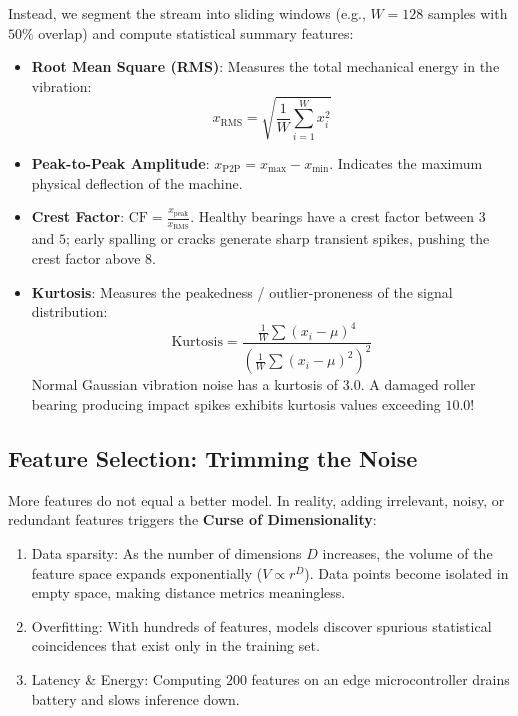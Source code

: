 Instead, we segment the stream into sliding windows (e.g., $W = 128$ samples with $50\%$ overlap) and compute statistical summary features:
\begin{itemize}
    \item \textbf{Root Mean Square (RMS)}: Measures the total mechanical energy in the vibration:
    \begin{equation}
    x_{\text{RMS}} = \sqrt{\frac{1}{W} \sum_{i=1}^{W} x_i^2}\label{eq:window_rms}
    \end{equation}
    \item \textbf{Peak-to-Peak Amplitude}: $x_{\text{P2P}} = x_{\max} - x_{\min}$. Indicates the maximum physical deflection of the machine.
    \item \textbf{Crest Factor}: $\text{CF} = \frac{x_{\text{peak}}}{x_{\text{RMS}}}$. Healthy bearings have a crest factor between $3$ and $5$; early spalling or cracks generate sharp transient spikes, pushing the crest factor above $8$.
    \item \textbf{Kurtosis}: Measures the peakedness / outlier-proneness of the signal distribution:
    \begin{equation}
    \text{Kurtosis} = \frac{\frac{1}{W}\sum (x_i - \mu)^4}{\left( \frac{1}{W}\sum (x_i - \mu)^2 \right)^2}\label{eq:kurtosis_def}
    \end{equation}
    Normal Gaussian vibration noise has a kurtosis of $3.0$. A damaged roller bearing producing impact spikes exhibits kurtosis values exceeding $10.0$!
\end{itemize}

\subsection{Feature Selection: Trimming the Noise}\label{subsec:feature_selection}

More features do not equal a better model. In reality, adding irrelevant, noisy, or redundant features triggers the \textbf{Curse of Dimensionality}:
\begin{enumerate}
    \item Data sparsity: As the number of dimensions $D$ increases, the volume of the feature space expands exponentially ($V \propto r^D$). Data points become isolated in empty space, making distance metrics meaningless.
    \item Overfitting: With hundreds of features, models discover spurious statistical coincidences that exist only in the training set.
    \item Latency \& Energy: Computing $200$ features on an edge microcontroller drains battery and slows inference down.
\end{enumerate}

